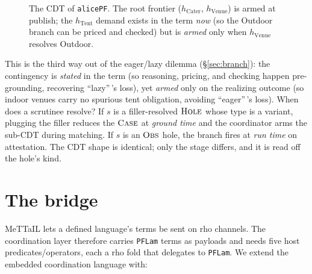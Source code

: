 \documentclass[11pt]{article}
\newcommand{\rul}[1]{\ensuremath{\textsc{#1}}}
\newcommand{\code}[1]{\lstinline[language=rho,basicstyle=\ttfamily\small]|#1|}
\begin{document}
\begin{figure}[h]
\centering
{}
\caption{The CDT of \code{alicePF}. The root frontier ($h_{\mathrm{Cater}}$, $h_{\mathrm{Venue}}$) is
armed at publish; the $h_{\mathrm{Tent}}$ demand exists in the term \emph{now} (so the Outdoor branch
can be priced and checked) but is \emph{armed} only when $h_{\mathrm{Venue}}$ resolves Outdoor.}
\label{fig:cdt}
\end{figure}

\noindent
This is the third way out of the eager/lazy dilemma (\S\ref{sec:branch}): the contingency is
\emph{stated} in the term (so reasoning, pricing, and checking happen pre-grounding, recovering
``lazy''\,'s loss), yet \emph{armed} only on the realizing outcome (so indoor venues carry no spurious
tent obligation, avoiding ``eager''\,'s loss). When does a scrutinee resolve? If $s$ is a
filler-resolved \rul{Hole} whose type is a variant, plugging the filler reduces the $\rul{Case}$ at
\emph{ground time} and the coordinator arms the sub-CDT during matching. If $s$ is an \rul{Obs} hole,
the branch fires at \emph{run time} on attestation. The CDT shape is identical; only the stage differs,
and it is read off the hole's kind.

\section{The bridge}\label{sec:bridge}
MeTTaIL lets a defined language's terms be sent on rho channels. The coordination layer therefore
carries \texttt{PFLam} terms as payloads and needs five host predicates/operators, each a rho fold
that delegates to \texttt{PFLam}. We extend the embedded coordination language with:
\end{document}
